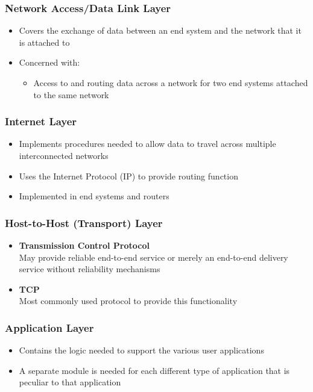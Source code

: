 \documentclass[pdflatex,compress]{beamer}
\begin{document}
\begin{frame}
	\frametitle{Network Access/Data Link Layer}
	\begin{itemize}
		\item Covers the exchange of data between an end system and the network that it is attached to
		\item Concerned with:
		\begin{itemize}
			\item Access to and routing data across a network for two end systems attached to the same network
		\end{itemize}
	\end{itemize}
\end{frame}

\begin{frame}
	\frametitle{Internet Layer}
	\begin{itemize}
		\item Implements procedures needed to allow data to travel across multiple interconnected networks
		\item Uses the Internet Protocol (IP) to provide routing function
		\item Implemented in end systems and routers
	\end{itemize}
\end{frame}

\begin{frame}
	\frametitle{Host-to-Host (Transport) Layer}
	\begin{itemize}
		\item \textbf{Transmission Control Protocol}\\
		May provide reliable end-to-end service or merely an end-to-end delivery service without reliability mechanisms
		\item \textbf{TCP}\\
		Most commonly used protocol to provide this functionality
	\end{itemize}
\end{frame}

\begin{frame}
	\frametitle{Application Layer}
	\begin{itemize}
		\item Contains the logic needed to support the various user applications
		\item A separate module is needed for each different type of application that is peculiar to that application
	\end{itemize}
\end{frame}
\end{document}
